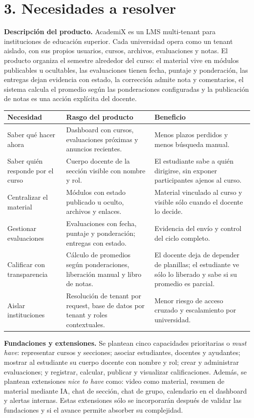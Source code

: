 \documentclass[letterpaper,10pt]{article}
\begin{document}
\section{3. Necesidades a resolver}

\textbf{Descripción del producto.} AcademiX es un LMS multi-tenant para instituciones de educación superior. Cada universidad opera como un tenant aislado, con sus propios usuarios, cursos, archivos, evaluaciones y notas. El producto organiza el semestre alrededor del curso: el material vive en módulos publicables u ocultables, las evaluaciones tienen fecha, puntaje y ponderación, las entregas dejan evidencia con estado, la corrección admite nota y comentarios, el sistema calcula el promedio según las ponderaciones configuradas y la publicación de notas es una acción explícita del docente.

{\small
\begin{tabularx}{\textwidth}{|p{3.05cm}|Y|Y|}
\hline
\textbf{Necesidad} & \textbf{Rasgo del producto} & \textbf{Beneficio} \\
\hline
Saber qué hacer ahora & Dashboard con cursos, evaluaciones próximas y anuncios recientes. & Menos plazos perdidos y menos búsqueda manual. \\
\hline
Saber quién responde por el curso & Cuerpo docente de la sección visible con nombre y rol. & El estudiante sabe a quién dirigirse, sin exponer participantes ajenos al curso. \\
\hline
Centralizar el material & Módulos con estado publicado u oculto, archivos y enlaces. & Material vinculado al curso y visible sólo cuando el docente lo decide. \\
\hline
Gestionar evaluaciones & Evaluaciones con fecha, puntaje y ponderación; entregas con estado. & Evidencia del envío y control del ciclo completo. \\
\hline
Calificar con transparencia & Cálculo de promedios según ponderaciones, liberación manual y libro de notas. & El docente deja de depender de planillas; el estudiante ve sólo lo liberado y sabe si su promedio es parcial. \\
\hline
Aislar instituciones & Resolución de tenant por request, base de datos por tenant y roles contextuales. & Menor riesgo de acceso cruzado y escalamiento por universidad. \\
\hline
\end{tabularx}}

\textbf{Fundaciones y extensiones.} Se plantean cinco capacidades prioritarias o \emph{must have}: representar cursos y secciones; asociar estudiantes, docentes y ayudantes; mostrar al estudiante su cuerpo docente con nombre y rol; crear y administrar evaluaciones; y registrar, calcular, publicar y visualizar calificaciones. Además, se plantean extensiones \emph{nice to have} como: video como material, resumen de material mediante IA, chat de sección, chat de grupo, calendario en el dashboard y alertas internas. Estas extensiones sólo se incorporarán después de validar las fundaciones y si el avance permite absorber su complejidad.
\end{document}
